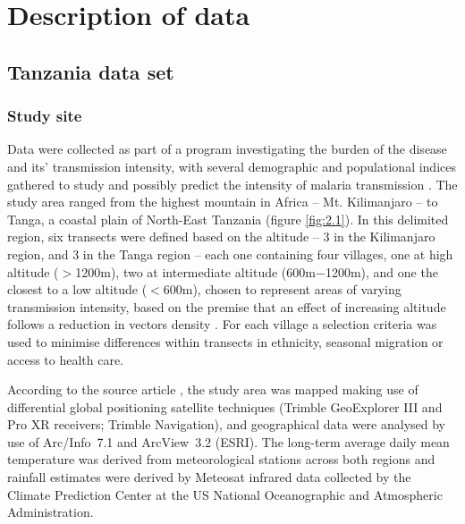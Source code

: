 
\chapter{Description of data}

\section{Tanzania data set}

\subsection{Study site}

Data were collected as part of a program investigating the burden of the disease and its' transmission intensity, with several demographic and populational indices gathered to study and possibly predict the intensity of malaria transmission \cite{drakeley2005altitude}. The study area ranged from the highest mountain in Africa -- Mt. Kilimanjaro -- to Tanga, a coastal plain of North-East Tanzania (figure \ref{fig:2.1}). In this delimited region, six transects were defined based on the altitude -- 3 in the Kilimanjaro region, and 3 in the Tanga region -- each one containing four villages, one at high altitude ($>$1200m), two at intermediate altitude (600m$-$1200m), and one the closest to a low altitude ($<$600m), chosen to represent areas of varying transmission intensity, based on the premise that an effect of increasing altitude follows a reduction in vectors density \cite{bodker2003relationship}. For each village a selection criteria was used to minimise differences within transects in ethnicity, seasonal migration or access to health care.

According to the source article \cite{drakeley2005altitude}, the study area was mapped making use of differential global positioning satellite techniques (Trimble GeoExplorer III and Pro XR receivers; Trimble Navigation), and geographical data were analysed by use of Arc/Info~7.1 and ArcView~3.2 (ESRI). The long-term average daily mean temperature was derived from meteorological stations across both regions and rainfall estimates were derived by Meteosat infrared data collected by the Climate Prediction Center at the US National Oceanographic and Atmospheric Administration.

